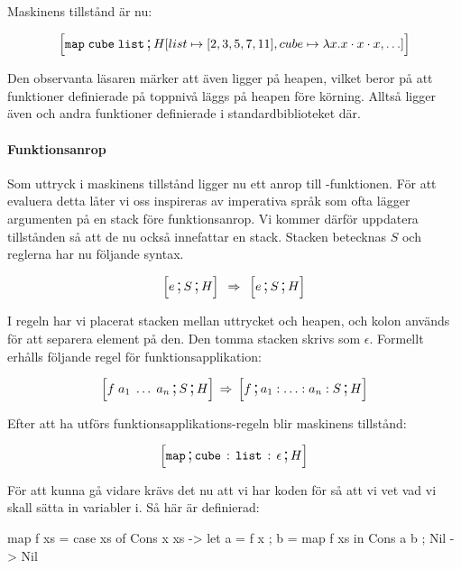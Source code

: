 \documentclass[../Core]{subfiles}
\begin{document}
Maskinens tillstånd är nu:

\begin{align*}
\text{\large$$}\Big[\mathtt{map\; cube\; list} \,\text{\Large;}\, H[list\mapsto[2,3,5,7,11],cube\mapsto\lambda x.x\cdot x\cdot x,\ldots]\Big]
\end{align*}


Den observanta läsaren märker att även  ligger på heapen, vilket
beror på att funktioner definierade på toppnivå läggs på heapen före körning.
Alltså ligger även  och andra funktioner definierade
i standardbiblioteket där.

\paragraph{Funktionsanrop} Som uttryck i maskinens tillstånd ligger nu ett anrop till
-funktionen. %
För att evaluera detta låter vi oss inspireras av imperativa språk som ofta lägger argumenten
på en stack före funktionsanrop. Vi kommer därför uppdatera tillstånden så att de
nu också innefattar en stack. Stacken betecknas $S$ och reglerna har nu följande syntax.

\begin{equation*} 
\text{\large$$}\Big[e \,\text{\Large;}\, S \,\text{\Large;}\, H\Big] \; \,\Rightarrow\, \; \text{\large$$}\Big[e \,\text{\Large;}\, S \,\text{\Large;}\, H\Big]
\end{equation*} 

I regeln har vi placerat stacken mellan uttrycket och heapen, och kolon används
för att separera element på den. Den tomma stacken skrivs som $\epsilon$.
Formellt erhålls följande regel för funktionsapplikation:

\[
\text{\large$$}\Big[f\; a_{1}\;\ldots\; a_{n}\,\text{\Large;}\, S \,\text{\Large;}\, H\Big]\,\Rightarrow\, \text{\large$$}\Big[f\,\text{\Large;}\, a_{1}:\ldots:a_{n}:S\,\text{\Large;}\, H\Big]
\]


Efter att ha utförs funktionsapplikations-regeln blir maskinens tillstånd:

\[
\text{\large$$}\Big[\mathtt{map} \,\text{\Large;}\, \mathtt{cube} \,:\, \mathtt{list} \,:\, \epsilon \,\text{\Large;}\, H\Big]
\]

För att kunna gå vidare krävs det nu att vi har koden för  så att vi vet
vad vi skall sätta in variabler i. Så här är  definierad:


\begin{codeEx}
map f xs = case xs of
    { Cons x xs -> let { a = f x
                       ; b = map f xs
                       } in Cons a b
    ; Nil       -> Nil
    }
\end{codeEx}
\end{document}

